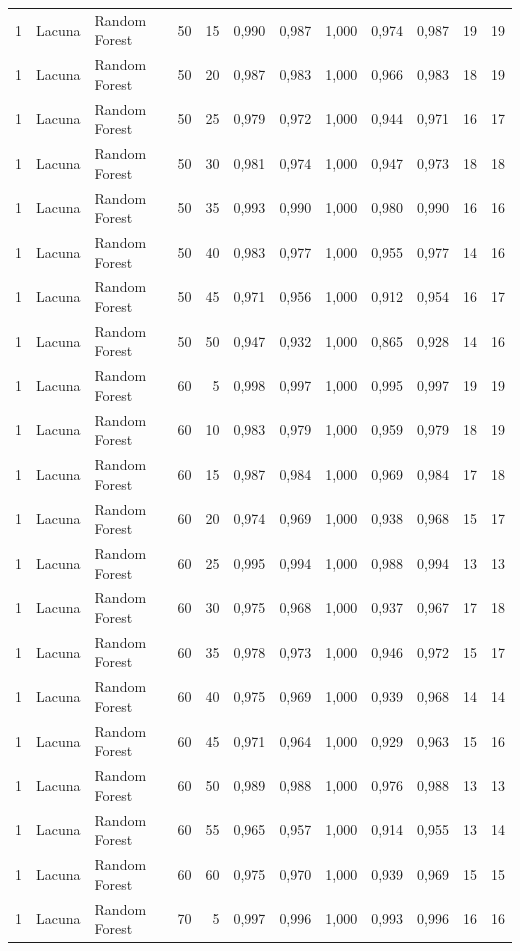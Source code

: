 \begin{longtable}{@{}rllrrrrrrrrr@{}}
1 & Lacuna & Random Forest & 50 & 15 & 0,990 & 0,987 & 1,000 & 0,974 & 0,987 & 19 & 19 \\
1 & Lacuna & Random Forest & 50 & 20 & 0,987 & 0,983 & 1,000 & 0,966 & 0,983 & 18 & 19 \\
1 & Lacuna & Random Forest & 50 & 25 & 0,979 & 0,972 & 1,000 & 0,944 & 0,971 & 16 & 17 \\
1 & Lacuna & Random Forest & 50 & 30 & 0,981 & 0,974 & 1,000 & 0,947 & 0,973 & 18 & 18 \\
1 & Lacuna & Random Forest & 50 & 35 & 0,993 & 0,990 & 1,000 & 0,980 & 0,990 & 16 & 16 \\
1 & Lacuna & Random Forest & 50 & 40 & 0,983 & 0,977 & 1,000 & 0,955 & 0,977 & 14 & 16 \\
1 & Lacuna & Random Forest & 50 & 45 & 0,971 & 0,956 & 1,000 & 0,912 & 0,954 & 16 & 17 \\
1 & Lacuna & Random Forest & 50 & 50 & 0,947 & 0,932 & 1,000 & 0,865 & 0,928 & 14 & 16 \\
1 & Lacuna & Random Forest & 60 & 5 & 0,998 & 0,997 & 1,000 & 0,995 & 0,997 & 19 & 19 \\
1 & Lacuna & Random Forest & 60 & 10 & 0,983 & 0,979 & 1,000 & 0,959 & 0,979 & 18 & 19 \\
1 & Lacuna & Random Forest & 60 & 15 & 0,987 & 0,984 & 1,000 & 0,969 & 0,984 & 17 & 18 \\
1 & Lacuna & Random Forest & 60 & 20 & 0,974 & 0,969 & 1,000 & 0,938 & 0,968 & 15 & 17 \\
1 & Lacuna & Random Forest & 60 & 25 & 0,995 & 0,994 & 1,000 & 0,988 & 0,994 & 13 & 13 \\
1 & Lacuna & Random Forest & 60 & 30 & 0,975 & 0,968 & 1,000 & 0,937 & 0,967 & 17 & 18 \\
1 & Lacuna & Random Forest & 60 & 35 & 0,978 & 0,973 & 1,000 & 0,946 & 0,972 & 15 & 17 \\
1 & Lacuna & Random Forest & 60 & 40 & 0,975 & 0,969 & 1,000 & 0,939 & 0,968 & 14 & 14 \\
1 & Lacuna & Random Forest & 60 & 45 & 0,971 & 0,964 & 1,000 & 0,929 & 0,963 & 15 & 16 \\
1 & Lacuna & Random Forest & 60 & 50 & 0,989 & 0,988 & 1,000 & 0,976 & 0,988 & 13 & 13 \\
1 & Lacuna & Random Forest & 60 & 55 & 0,965 & 0,957 & 1,000 & 0,914 & 0,955 & 13 & 14 \\
1 & Lacuna & Random Forest & 60 & 60 & 0,975 & 0,970 & 1,000 & 0,939 & 0,969 & 15 & 15 \\
1 & Lacuna & Random Forest & 70 & 5 & 0,997 & 0,996 & 1,000 & 0,993 & 0,996 & 16 & 16 \\

\end{longtable}
